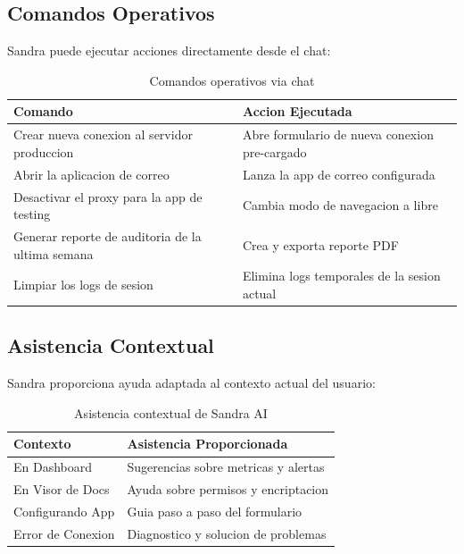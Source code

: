 \subsection{Comandos Operativos}

Sandra puede ejecutar acciones directamente desde el chat:

\begin{table}[H]
\centering
\begin{tabular}{p{7cm}p{7cm}}
\toprule
\textbf{Comando} & \textbf{Accion Ejecutada} \\
\midrule
Crear nueva conexion al servidor produccion & Abre formulario de nueva conexion pre-cargado \\
\midrule
Abrir la aplicacion de correo & Lanza la app de correo configurada \\
\midrule
Desactivar el proxy para la app de testing & Cambia modo de navegacion a libre \\
\midrule
Generar reporte de auditoria de la ultima semana & Crea y exporta reporte PDF \\
\midrule
Limpiar los logs de sesion & Elimina logs temporales de la sesion actual \\
\bottomrule
\end{tabular}
\caption{Comandos operativos via chat}
\label{tab:comandos-operativos}
\end{table}

\subsection{Asistencia Contextual}

Sandra proporciona ayuda adaptada al contexto actual del usuario:

\begin{table}[H]
\centering
\begin{tabular}{p{4cm}p{8cm}}
\toprule
\textbf{Contexto} & \textbf{Asistencia Proporcionada} \\
\midrule
En Dashboard & Sugerencias sobre metricas y alertas \\
\midrule
En Visor de Docs & Ayuda sobre permisos y encriptacion \\
\midrule
Configurando App & Guia paso a paso del formulario \\
\midrule
Error de Conexion & Diagnostico y solucion de problemas \\
\bottomrule
\end{tabular}
\caption{Asistencia contextual de Sandra AI}
\label{tab:asistencia-contextual}
\end{table}


